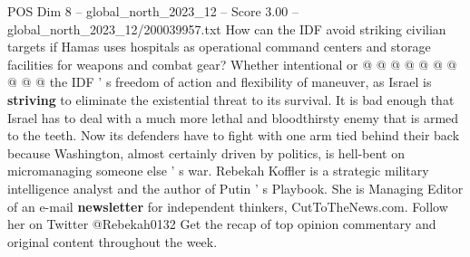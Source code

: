 \begin{textsample}{POS Dim 8 – global\_north\_2023\_12 – Score 3.00 – global\_north\_2023\_12/200039957.txt}
How can the IDF avoid striking civilian targets if Hamas uses hospitals as operational command centers and storage facilities for weapons and combat gear?
Whether intentional or @ @ @ @ @ @ @ @ @ @ the IDF ' s freedom of action and flexibility of maneuver, as Israel is \textbf{striving} to eliminate the existential threat to its survival.
It is bad enough that Israel has to deal with a much more lethal and bloodthirsty enemy that is armed to the teeth.
Now its defenders have to fight with one arm tied behind their back because Washington, almost certainly driven by politics, is hell-bent on micromanaging someone else ' s war.
Rebekah Koffler is a strategic military intelligence analyst and the author of Putin ' s Playbook.
She is Managing Editor of an e-mail \textbf{newsletter} for independent thinkers, CutToTheNews.com.
Follow her on Twitter @Rebekah0132 Get the recap of top opinion commentary and original content throughout the week.

\end{textsample}
